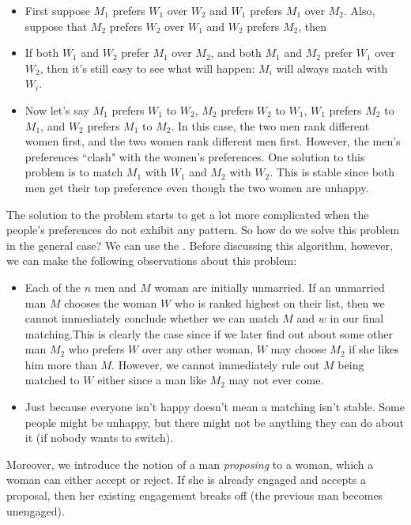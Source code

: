 \begin{itemize}
    \item First suppose $M_1$ prefers $W_1$ over $W_2$ and $W_1$ prefers $M_1$ over $M_2$. Also, suppose that $M_2$ prefers $W_2$ over $W_1$ and $W_2$ prefers $M_2$, then 
    \item If both $W_1$ and $W_2$ prefer $M_1$ over $M_2$, and both $M_1$ and $M_2$ prefer $W_1$ over $W_2$, then it's still easy to see what will happen: $M_i$ will always match with $W_i$.
    \item Now let's say $M_1$ prefers $W_1$ to $W_2$, $M_2$ prefers $W_2$ to $W_1$, $W_1$ prefers $M_2$ to $M_1$, and $W_2$ prefers $M_1$ to $M_2$. In this case, the two men rank different women first, and the two women rank different men first. However, the men's preferences ``clash" with the women's preferences. One solution to this problem is to match $M_1$ with $W_1$ and $M_2$ with $W_2$. This is stable since both men get their top preference even though the two women are unhappy.
\end{itemize}

The solution to the problem starts to get a lot more complicated when the people's preferences do not exhibit any pattern. So how do we solve this problem in the general case? We can use the . Before discussing this algorithm, however, we can make the following observations about this problem:

\begin{itemize}
    \item Each of the $n$ men and $M$ woman are initially unmarried. If an unmarried man $M$ chooses the woman $W$ who is ranked highest on their list, then we cannot immediately conclude whether we can match $M$ and $w$ in our final matching.This is clearly the case since if we later find out about some other man $M_2$ who prefers $W$ over any other woman, $W$ may choose $M_2$ if she likes him more than $M$. However, we cannot immediately rule out  $M$ being matched to $W$ either since a man like $M_2$ may not ever come. 
    \item Just because everyone isn't happy doesn't mean a matching isn't stable. Some people might be unhappy, but there might not be anything they can do about it (if nobody wants to switch).
\end{itemize}


Moreover, we introduce the notion of a man \textit{proposing} to a woman, which a woman can either accept or reject. If she is already engaged and accepts a proposal, then her existing engagement breaks off (the previous man becomes unengaged).  \\


